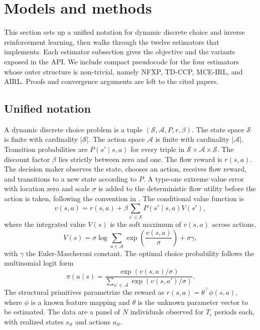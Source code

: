 \section{Models and methods} \label{sec:methods}

This section sets up a unified notation for dynamic discrete choice and inverse reinforcement learning, then walks through the twelve estimators that  implements. Each estimator subsection gives the objective and the variants exposed in the API. We include compact pseudocode for the four estimators whose outer structure is non-trivial, namely NFXP, TD-CCP, MCE-IRL, and AIRL. Proofs and convergence arguments are left to the cited papers.

\subsection{Unified notation}

A dynamic discrete choice problem is a tuple $(\mathcal{S}, \mathcal{A}, P, r, \beta)$. The state space $\mathcal{S}$ is finite with cardinality $|\mathcal{S}|$. The action space $\mathcal{A}$ is finite with cardinality $|\mathcal{A}|$. Transition probabilities are $P(s' \mid s, a)$ for every triple in $\mathcal{S} \times \mathcal{A} \times \mathcal{S}$. The discount factor $\beta$ lies strictly between zero and one. The flow reward is $r(s, a)$. The decision maker observes the state, chooses an action, receives flow reward, and transitions to a new state according to $P$. A type-one extreme value error with location zero and scale $\sigma$ is added to the deterministic flow utility before the action is taken, following the convention in \citet{rust1987}. The conditional value function is
\begin{equation}
v(s, a) = r(s, a) + \beta \sum_{s' \in \mathcal{S}} P(s' \mid s, a) V(s'),
\label{eq:v}
\end{equation}
where the integrated value $V(s)$ is the soft maximum of $v(s, a)$ across actions,
\begin{equation}
V(s) = \sigma \log \sum_{a \in \mathcal{A}} \exp\left(\frac{v(s, a)}{\sigma}\right) + \sigma \gamma,
\label{eq:V}
\end{equation}
with $\gamma$ the Euler-Mascheroni constant. The optimal choice probability follows the multinomial logit form
\begin{equation}
\pi(a \mid s) = \frac{\exp(v(s, a) / \sigma)}{\sum_{a' \in \mathcal{A}} \exp(v(s, a') / \sigma)}.
\label{eq:pi}
\end{equation}
The structural primitives parametrize the reward as $r(s, a) = \theta^\top \phi(s, a)$, where $\phi$ is a known feature mapping and $\theta$ is the unknown parameter vector to be estimated. The data are a panel of $N$ individuals observed for $T_i$ periods each, with realized states $s_{it}$ and actions $a_{it}$.

